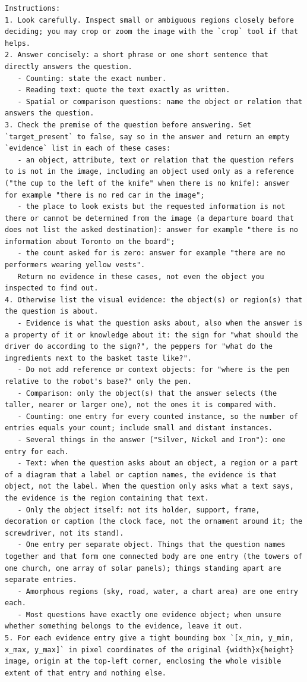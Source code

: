 \documentclass{article}
\begin{document}
\begin{lstlisting}
Instructions:
1. Look carefully. Inspect small or ambiguous regions closely before deciding; you may crop or zoom the image with the `crop` tool if that helps.
2. Answer concisely: a short phrase or one short sentence that directly answers the question.
   - Counting: state the exact number.
   - Reading text: quote the text exactly as written.
   - Spatial or comparison questions: name the object or relation that answers the question.
3. Check the premise of the question before answering. Set `target_present` to false, say so in the answer and return an empty `evidence` list in each of these cases:
   - an object, attribute, text or relation that the question refers to is not in the image, including an object used only as a reference ("the cup to the left of the knife" when there is no knife): answer for example "there is no red car in the image";
   - the place to look exists but the requested information is not there or cannot be determined from the image (a departure board that does not list the asked destination): answer for example "there is no information about Toronto on the board";
   - the count asked for is zero: answer for example "there are no performers wearing yellow vests".
   Return no evidence in these cases, not even the object you inspected to find out.
4. Otherwise list the visual evidence: the object(s) or region(s) that the question is about.
   - Evidence is what the question asks about, also when the answer is a property of it or knowledge about it: the sign for "what should the driver do according to the sign?", the peppers for "what do the ingredients next to the basket taste like?".
   - Do not add reference or context objects: for "where is the pen relative to the robot's base?" only the pen.
   - Comparison: only the object(s) that the answer selects (the taller, nearer or larger one), not the ones it is compared with.
   - Counting: one entry for every counted instance, so the number of entries equals your count; include small and distant instances.
   - Several things in the answer ("Silver, Nickel and Iron"): one entry for each.
   - Text: when the question asks about an object, a region or a part of a diagram that a label or caption names, the evidence is that object, not the label. When the question only asks what a text says, the evidence is the region containing that text.
   - Only the object itself: not its holder, support, frame, decoration or caption (the clock face, not the ornament around it; the screwdriver, not its stand).
   - One entry per separate object. Things that the question names together and that form one connected body are one entry (the towers of one church, one array of solar panels); things standing apart are separate entries.
   - Amorphous regions (sky, road, water, a chart area) are one entry each.
   - Most questions have exactly one evidence object; when unsure whether something belongs to the evidence, leave it out.
5. For each evidence entry give a tight bounding box `[x_min, y_min, x_max, y_max]` in pixel coordinates of the original {width}x{height} image, origin at the top-left corner, enclosing the whole visible extent of that entry and nothing else.
\end{lstlisting}
\end{document}
